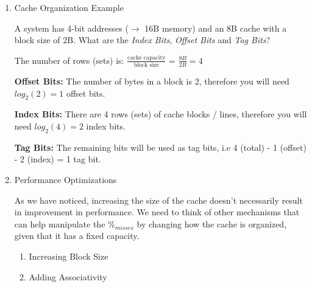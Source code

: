 \documentclass[12pt]{article}
\newenvironment{QandA}{\begin{enumerate}[label=\bfseries\arabic*.]\bfseries}
                      {\end{enumerate}}
\newenvironment{answered}{\par\quad\normalfont}{}
\begin{document}
\begin{QandA}
\begin{answered}
If you have a simple pipeline with $CPI_{base}=1$ and 30\% of instructions are LDR and STR. If the L1 cache has $\%_{miss}=2\%$ for the Instruction Cache (I\$) and $\%_{miss}=10\%$ for the Data Cache (D\$) with a miss penalty of $t_{miss}=10$ cycles for both, what is the new $CPI_{new}$?

\begin{equation*}
    CPI_{new} = CPI_{base} + \%_{I-miss} \times t_{I-miss} + \%_{D-miss} \times t_{D-miss}
\end{equation*}
\begin{equation*}
    CPI_{new} = 1.0 + 0.02 \times 10 + 0.1 \times 10 = 1 + 0.2 + 0.3 = 1.5
\end{equation*}
\end{answered}

\item Cache Organization Example
\begin{answered}
A system has 4-bit addresses ($\rightarrow$ 16B memory) and an 8B cache with a block size of 2B. What are the \textit{Index Bits}, \textit{Offset Bits} and \textit{Tag Bits}? 

The number of rows (sets) is: $\frac{\text{cache capacity}}{\text{block size}}$ = $\frac{8B}{2B} = 4$

\textbf{Offset Bits:} The number of bytes in a block is 2, therefore you will need $log_{2}(2)=1$ offset bits.

\textbf{Index Bits:} There are 4 rows (sets) of cache blocks / lines, therefore you will need $log_{2}(4)=2$ index bits.

\textbf{Tag Bits:} The remaining bits will be used as tag bits, i.e 4 (total) - 1 (offset) - 2 (index) = 1 tag bit. 
\end{answered}

\item Performance Optimizations
\begin{answered}
As we have noticed, increasing the size of the cache doesn't necessarily result in improvement in performance. We need to think of other mechanisms that can help manipulate the $\%_{misses}$ by changing how the cache is organized, given that it has a fixed capacity.

\begin{enumerate}
    \item Increasing Block Size
    \item Adding Associativity
\end{enumerate}
\end{answered}


\end{QandA}
\end{document}
